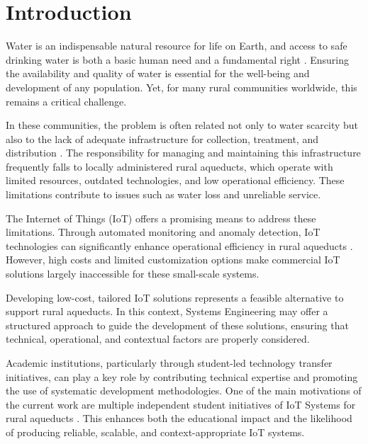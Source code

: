 \documentclass[conference]{IEEEtran}
\begin{document}
\section{Introduction}
Water is an indispensable natural resource for life on Earth, and access to safe drinking water is both a basic human need and a fundamental right \cite{un_resolution_2010}. Ensuring the availability and quality of water is essential for the well-being and development of any population. Yet, for many rural communities worldwide, this remains a critical challenge.

In these communities, the problem is often related not only to water scarcity but also to the lack of adequate infrastructure for collection, treatment, and distribution \cite{10.2166/washdev.2025.299} \cite{gaviria-montoya_risk_2020}. The responsibility for managing and maintaining this infrastructure frequently falls to locally administered rural aqueducts, which operate with limited resources, outdated technologies, and low operational efficiency. These limitations contribute to issues such as water loss and unreliable service.

The Internet of Things (IoT) offers a promising means to address these limitations. Through automated monitoring and anomaly detection, IoT technologies can significantly enhance operational efficiency in rural aqueducts \cite{6844741}. However, high costs and limited customization options make commercial IoT solutions largely inaccessible for these small-scale systems.

Developing low-cost, tailored IoT solutions represents a feasible alternative to support rural aqueducts. In this context, Systems Engineering may offer a structured approach to guide the development of these solutions, ensuring that technical, operational, and contextual factors are properly considered.

Academic institutions, particularly through student-led technology transfer initiatives, can play a key role by contributing technical expertise and promoting the use of systematic development methodologies. One of the main motivations of the current work are multiple independent student initiatives of IoT Systems for rural aqueducts \cite{Oviedo2024} \cite{Solorzano2021}. This enhances both the educational impact and the likelihood of producing reliable, scalable, and context-appropriate IoT systems.
\end{document}
